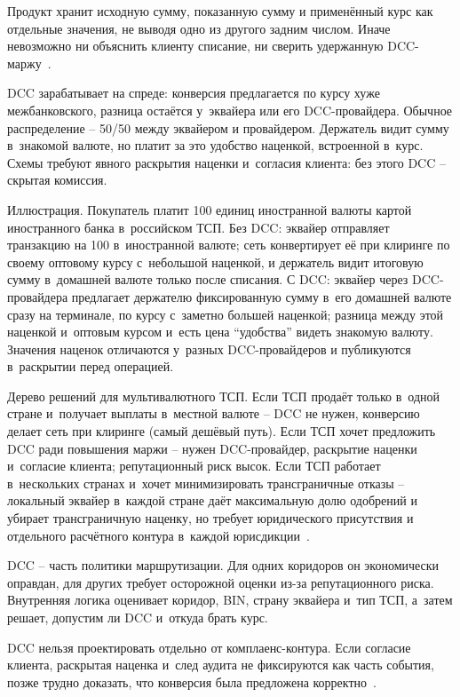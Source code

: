 Продукт хранит исходную сумму, показанную сумму и применённый
курс как отдельные значения, не выводя одно из другого
задним числом. Иначе невозможно ни объяснить клиенту
списание, ни сверить удержанную DCC-маржу~\cite{visa-core-rules,mc-tpr}.

DCC зарабатывает на спреде: конверсия предлагается по курсу
хуже межбанковского, разница остаётся у~эквайера или его
DCC-провайдера. Обычное распределение -- 50/50 между
эквайером и провайдером. Держатель видит сумму в~знакомой
валюте, но платит за это удобство наценкой, встроенной
в~курс. Схемы требуют явного раскрытия наценки и~согласия
клиента: без этого DCC -- скрытая комиссия.

Иллюстрация. Покупатель платит 100 единиц иностранной валюты
картой иностранного банка в~российском ТСП. Без DCC: эквайер
отправляет транзакцию на 100 в~иностранной валюте; сеть
конвертирует её при клиринге по своему оптовому курсу
с~небольшой наценкой, и держатель видит итоговую сумму
в~домашней валюте только после списания. С DCC: эквайер
через DCC-провайдера предлагает держателю фиксированную
сумму в~его домашней валюте сразу на терминале, по курсу
с~заметно большей наценкой; разница между этой наценкой
и~оптовым курсом и~есть цена \enquote{удобства} видеть знакомую
валюту. Значения наценок отличаются у~разных
DCC-провайдеров и публикуются в~раскрытии перед операцией.

Дерево решений для мультивалютного ТСП. Если ТСП продаёт
только в~одной стране и~получает выплаты в~местной
валюте -- DCC не нужен, конверсию делает сеть при клиринге
(самый дешёвый путь). Если ТСП хочет предложить DCC ради
повышения маржи -- нужен DCC-провайдер, раскрытие наценки
и~согласие клиента; репутационный риск высок. Если ТСП
работает в~нескольких странах и~хочет минимизировать
трансграничные отказы -- локальный эквайер в~каждой стране
даёт максимальную долю одобрений и убирает трансграничную
наценку, но требует юридического присутствия и отдельного
расчётного контура в~каждой юрисдикции~\cite{visa-core-rules,mc-tpr}.

DCC -- часть политики маршрутизации. Для одних
коридоров он экономически оправдан, для других требует
осторожной оценки из-за репутационного риска. Внутренняя
логика оценивает коридор, BIN, страну эквайера и~тип ТСП,
а~затем решает, допустим ли DCC и~откуда брать курс.

DCC нельзя проектировать отдельно от комплаенс-контура.
Если согласие клиента, раскрытая наценка и~след аудита
не фиксируются как часть события, позже трудно доказать,
что конверсия была предложена корректно~\cite{visa-core-rules,mc-tpr}.

